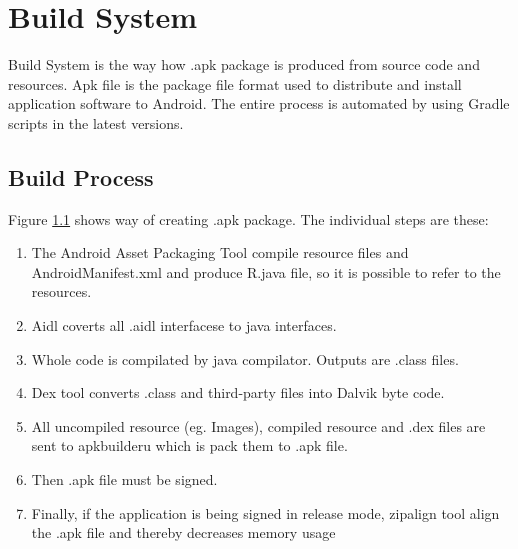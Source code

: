 \section{Build System}%
Build System is the way how .apk package is produced from source code and resources. Apk file is the package file format used to distribute and install application software to Android. The entire process is automated by using Gradle scripts in the latest versions.

\subsection{Build Process}\label{buildProcess}
Figure \ref{buildProcess} shows way of creating .apk package. The individual steps are these:
\begin{enumerate}
\item The Android Asset Packaging Tool compile resource files and AndroidManifest.xml and produce R.java file, so it is possible to refer to the resources.
\item Aidl coverts all .aidl interfacese to java interfaces.
\item Whole code is compilated by java compilator. Outputs are .class files. 
\item Dex tool converts .class and third-party files into Dalvik byte code.
\item All uncompiled resource (eg. Images), compiled resource and .dex files are sent to apkbuilderu which is pack them to .apk file.
\item Then .apk file must be signed.
\item Finally, if the application is being signed in release mode, zipalign tool align the .apk file and thereby decreases memory usage
\end{enumerate}

